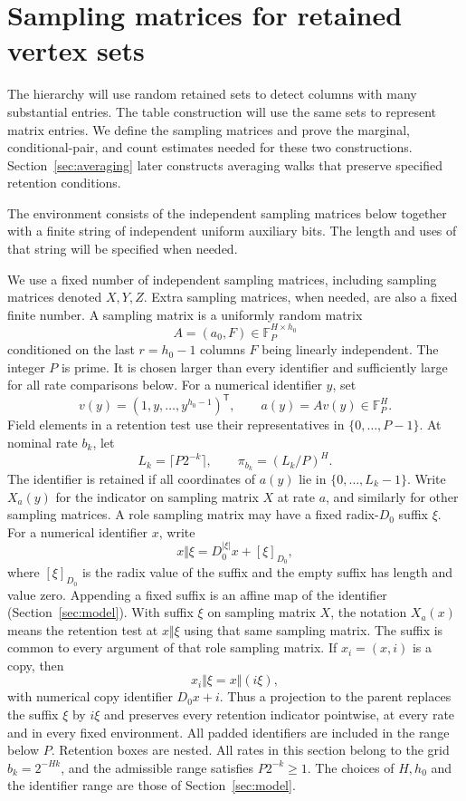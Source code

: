 \section{Sampling matrices for retained vertex sets}\label{sec:env}

The hierarchy will use random retained sets to detect columns with many
substantial entries.  The table construction will use the same sets to
represent matrix entries.  We define the sampling matrices and prove the
marginal, conditional-pair, and count estimates needed for these two
constructions.  Section~\ref{sec:averaging} later constructs averaging
walks that preserve specified retention conditions.

The environment consists of the independent sampling matrices below together
with a finite string of independent uniform auxiliary bits.  The length
and uses of that string will be specified when needed.

We use a fixed number of independent sampling matrices, including sampling matrices
denoted $X,Y,Z$. Extra sampling matrices, when needed, are also a fixed finite
number. A sampling matrix is a uniformly random matrix
\[
A=(a_0,F)\in\mathbb F_P^{H\times h_0}
\]
conditioned on the last $r=h_0-1$ columns $F$ being linearly
independent.
The integer $P$ is prime. It is chosen larger than every
identifier and sufficiently large for all rate comparisons below.
For a numerical identifier $y$, set
\[
v(y)=(1,y,\ldots,y^{h_0-1})^{\mathsf T},
\qquad a(y)=Av(y)\in\mathbb F_P^H.
\]
Field elements in a retention test use their representatives in
$\{0,\ldots,P-1\}$. At nominal rate $b_k$, let
\[
L_k=\lceil P2^{-k}\rceil,\qquad
\pi_{b_k}=(L_k/P)^H.
\]
The identifier is retained if all coordinates of $a(y)$ lie in
$\{0,\ldots,L_k-1\}$. Write $X_a(y)$ for the indicator on sampling matrix
$X$ at rate $a$, and similarly for other sampling matrices.
A role sampling matrix may have a fixed radix-$D_0$ suffix $\xi$.
For a numerical identifier $x$, write
\[
 x\Vert\xi=D_0^{|\xi|}x+[\xi]_{D_0},
\]
where $[\xi]_{D_0}$ is the radix value of the suffix and the empty suffix
has length and value zero.  Appending a fixed suffix is an affine map
of the identifier (Section~\ref{sec:model}).  With suffix $\xi$ on
sampling matrix $X$, the
notation $X_a(x)$ means the retention test at $x\Vert\xi$ using that
same sampling matrix.  The suffix is common to every argument of that
role sampling matrix.  If $x_i=(x,i)$ is a copy, then
\begin{equation}
 x_i\Vert\xi=x\Vert(i\xi),
 \label{eq:env-suffix-identity}
\end{equation}
with numerical copy identifier $D_0x+i$.  Thus a projection to the
parent replaces the suffix $\xi$ by $i\xi$ and preserves every retention
indicator pointwise, at every rate and in every fixed environment.
All padded identifiers are included in the range below $P$.
Retention boxes are nested.
All rates in this section belong to the grid $b_k=2^{-Hk}$, and the
admissible range satisfies $P2^{-k}\ge1$. The choices of $H,h_0$ and
the identifier range are those of Section~\ref{sec:model}.

